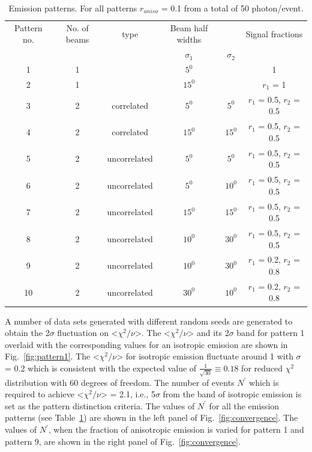 \begin{table}[h]
  \centering
  \caption{Emission patterns. For all patterns $r_{aniso}$ = 0.1 from a 
  total of 50 photon/event.}
  \label{tab:AnisoPattern}
  \begin{tabular}{|c |c |c| c c | c|}
  \hline
  Pattern no. & No. of beams & type & Beam half widths& & Signal fractions \\
              &              &      &  $\sigma_1$ & $\sigma_2$   &      \\
  \hline
  1 & 1 & & $5^{0}$ & & 1 \\
   2 & 1 & & $15^{0}$ & & $r_1$ = 1 \\
   3 & 2 & correlated & $5^{0}$ & $5^{0}$ & $r_1$ = 0.5, $r_2$ = 0.5  \\
   4 & 2 & correlated & $15^{0}$ & $15^{0}$ & $r_1$ = 0.5, $r_2$ = 0.5 \\
   5 & 2 & uncorrelated & $5^{0}$ & $5^{0}$ & $r_1$ = 0.5, $r_2$ = 0.5 \\
   6 & 2 & uncorrelated & $5^{0}$ & $10^{0}$ & $r_1$ = 0.5, $r_2$ = 0.5 \\
   7 & 2 & uncorrelated & $15^{0}$ & $15^{0}$ & $r_1$ = 0.5, $r_2$ = 0.5 \\
   8 & 2 & uncorrelated & $10^{0}$ & $30^{0}$ & $r_1$ = 0.5, $r_2$ = 0.5 \\
   9 & 2 & uncorrelated & $10^{0}$ & $30^{0}$ & $r_1$ = 0.2, $r_2$ = 0.8 \\
    10 & 2 & uncorrelated & $30^{0}$ & $10^{0}$ & $r_1$ = 0.2, $r_2$ = 0.8 \\
  \hline
 \end{tabular}
\end{table}

A number of data sets generated with different random seeds are 
generated to obtain the 2$\sigma$ fluctuation on <$\chi^2/\nu$>. The <$\chi^2/\nu$> 
and its 2$\sigma$ band for pattern 1 overlaid with the corresponding values 
for an isotropic emission are shown in Fig.~\ref{fig:pattern1}. The <$\chi^2/\nu$> for 
isotropic emission fluctuate around 1 with $\sigma$ = 0.2 which is consistent with 
the expected value of $\frac{1}{\sqrt{30}} \equiv 0.18$ for reduced $\chi^2$ distribution 
with 60 degrees of freedom. The number of events 
$N^{'}$ which is required to achieve <$\chi^2/\nu$> = 2.1, i.e., 5$\sigma$ from the 
band of isotropic emission is set as the pattern distinction criteria. The values of 
$N^{'}$ for all the emission patterns (see Table~\ref{tab:AnisoPattern}) are shown 
in the left panel of Fig.~\ref{fig:convergence}. The values of $N^{'}$, when the fraction of anisotropic 
emission is varied for pattern 1 and pattern 9, are shown in the right panel of Fig.~\ref{fig:convergence}. 

